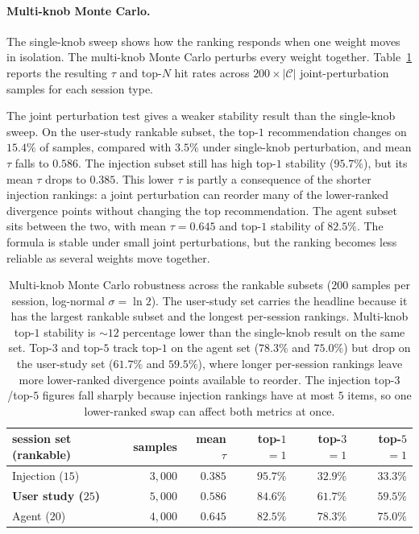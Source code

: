 \paragraph{Multi-knob Monte Carlo.}
The single-knob sweep shows how the ranking responds when one weight moves in isolation. The multi-knob Monte Carlo perturbs every weight together. Table~\ref{tab:results-sensitivity-mc} reports the resulting $\tau$ and top-$N$ hit rates across $200 \times \lvert \mathcal{C} \rvert$ joint-perturbation samples for each session type.

The joint perturbation test gives a weaker stability result than the single-knob sweep. On the user-study rankable subset, the top-$1$ recommendation changes on $15.4\%$ of samples, compared with $3.5\%$ under single-knob perturbation, and mean $\tau$ falls to $0.586$. The injection subset still has high top-$1$ stability ($95.7\%$), but its mean $\tau$ drops to $0.385$. This lower $\tau$ is partly a consequence of the shorter injection rankings: a joint perturbation can reorder many of the lower-ranked divergence points without changing the top recommendation. The agent subset sits between the two, with mean $\tau = 0.645$ and top-$1$ stability of $82.5\%$. The formula is stable under small joint perturbations, but the ranking becomes less reliable as several weights move together.

\begin{table}[htbp]
\centering
\small
\begin{tabular}{lrrrrr}
\hline
\textbf{session set (rankable)} & \textbf{samples} & \textbf{mean $\tau$} & \textbf{top-$1$ $= 1$} & \textbf{top-$3$ $= 1$} & \textbf{top-$5$ $= 1$} \\
\hline
Injection ($15$)         & $3{,}000$ & $0.385$ & $95.7\%$ & $32.9\%$ & $33.3\%$ \\
\textbf{User study ($25$)} & $5{,}000$ & $\mathbf{0.586}$ & $\mathbf{84.6\%}$ & $\mathbf{61.7\%}$ & $59.5\%$ \\
Agent ($20$)              & $4{,}000$ & $0.645$ & $82.5\%$ & $78.3\%$ & $75.0\%$ \\
\hline
\end{tabular}
\caption{Multi-knob Monte Carlo robustness across the rankable subsets ($200$ samples per session, log-normal $\sigma = \ln 2$). The user-study set carries the headline because it has the largest rankable subset and the longest per-session rankings. Multi-knob top-$1$ stability is $\sim 12$ percentage lower than the single-knob result on the same set. Top-$3$ and top-$5$ track top-$1$ on the agent set ($78.3\%$ and $75.0\%$) but drop on the user-study set ($61.7\%$ and $59.5\%$), where longer per-session rankings leave more lower-ranked divergence points available to reorder. The injection top-$3$/top-$5$ figures fall sharply because injection rankings have at most $5$ items, so one lower-ranked swap can affect both metrics at once.}
\label{tab:results-sensitivity-mc}
\end{table}

